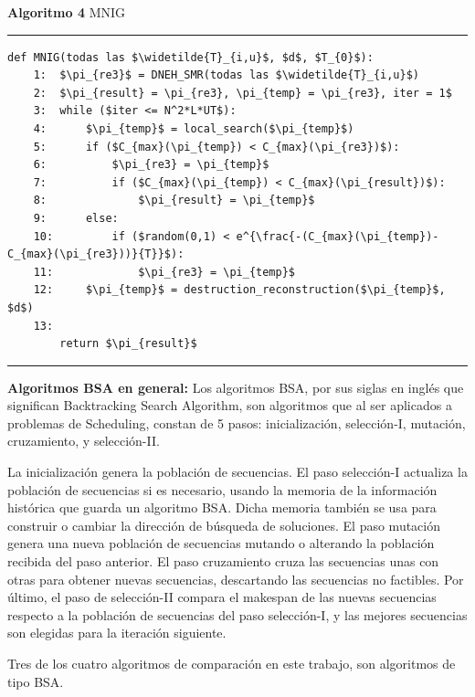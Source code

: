 \documentclass{article}
\begin{document}
\textbf{Algoritmo 4} MNIG

\noindent\noindent
\rule{\linewidth}{0.4pt}

\begin{lstlisting}[mathescape=true]
    def MNIG(todas las $\widetilde{T}_{i,u}$, $d$, $T_{0}$):
    1:  $\pi_{re3}$ = DNEH_SMR(todas las $\widetilde{T}_{i,u}$)
    2:  $\pi_{result} = \pi_{re3}, \pi_{temp} = \pi_{re3}, iter = 1$
    3:  while ($iter <= N^2*L*UT$):
    4:      $\pi_{temp}$ = local_search($\pi_{temp}$)
    5:      if ($C_{max}(\pi_{temp}) < C_{max}(\pi_{re3})$):
    6:          $\pi_{re3} = \pi_{temp}$
    7:          if ($C_{max}(\pi_{temp}) < C_{max}(\pi_{result})$):
    8:              $\pi_{result} = \pi_{temp}$
    9:      else:
    10:         if ($random(0,1) < e^{\frac{-(C_{max}(\pi_{temp})-C_{max}(\pi_{re3}))}{T}}$):
    11:             $\pi_{re3} = \pi_{temp}$
    12:     $\pi_{temp}$ = destruction_reconstruction($\pi_{temp}$, $d$)
    13:
        return $\pi_{result}$
\end{lstlisting}

\noindent\noindent
\rule{\linewidth}{0.4pt}

\vspace{\baselineskip}
\textbf{Algoritmos BSA en general:} Los algoritmos BSA, por sus siglas en inglés que significan Backtracking Search Algorithm, son algoritmos que al ser aplicados a problemas de Scheduling, constan de 5 pasos: inicialización, selección-I, mutación, cruzamiento, y selección-II. \autocite{modFMMSP}

\vspace{\baselineskip}
La inicialización genera la población de secuencias. El paso selección-I actualiza la población de secuencias si es necesario, usando la memoria de la información histórica que guarda un algoritmo BSA. Dicha memoria también se usa para construir o cambiar la dirección de búsqueda de soluciones. El paso mutación genera una nueva población de secuencias mutando o alterando la población recibida del paso anterior. El paso cruzamiento cruza las secuencias unas con otras para obtener nuevas secuencias, descartando las secuencias no factibles. Por último, el paso de selección-II compara el makespan de las nuevas secuencias respecto a la población de secuencias del paso selección-I, y las mejores secuencias son elegidas para la iteración siguiente. \autocite{modFMMSP}

\vspace{\baselineskip}
Tres de los cuatro algoritmos de comparación en este trabajo, son algoritmos de tipo BSA.
\end{document}
